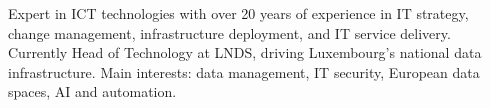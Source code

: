 

\begin{cvparagraph}

Expert in ICT technologies with over 20 years of experience in IT strategy, change management, infrastructure deployment, and IT service delivery. Currently Head of Technology at LNDS, driving Luxembourg's national data infrastructure. Main interests: data management, IT security, European data spaces, AI and automation.
\end{cvparagraph}
